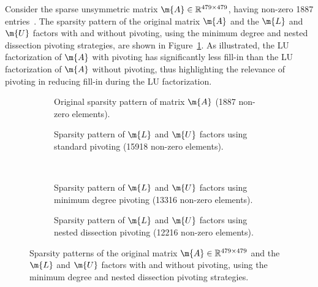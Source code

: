 \begin{example}
  Consider the  sparse unsymmetric matrix $\m{A} \in \mathbb{R}^{479 \times 479}$, having non-zero 1887 entries~\cite{matlab}. The sparsity pattern of the original matrix $\m{A}$ and the $\m{L}$ and $\m{U}$ factors with and without pivoting, using the minimum degree and nested dissection pivoting strategies, are shown in Figure~\ref{chap3:fig:sparsity_patterns}. As illustrated, the \ac{LU} factorization of $\m{A}$ with pivoting has significantly less fill-in than the \ac{LU} factorization of $\m{A}$ without pivoting, thus highlighting the relevance of pivoting in reducing fill-in during the \ac{LU} factorization.
  \begin{figure}[htb]
    \centering
    \begin{subfigure}[t]{0.45\textwidth}
      \centering
      \small{}
      \caption{Original sparsity pattern of matrix $\m{A}$ (1887 non-zero elements).}
    \end{subfigure}%
    \hfill%
    \begin{subfigure}[t]{0.45\textwidth}
      \centering
      \small{}
      \caption{Sparsity pattern of $\m{L}$ and $\m{U}$ factors using standard pivoting (15918 non-zero elements).}
    \end{subfigure} \\[1.0em]
    \begin{subfigure}[t]{0.45\textwidth}
      \centering
      \small{}
      \caption{Sparsity pattern of $\m{L}$ and $\m{U}$ factors using minimum degree pivoting (13316 non-zero elements).}
    \end{subfigure}%
    \hfill%
    \begin{subfigure}[t]{0.45\textwidth}
      \centering
      \small{}
      \caption{Sparsity pattern of $\m{L}$ and $\m{U}$ factors using nested dissection pivoting (12216 non-zero elements).}
    \end{subfigure}
    \caption{Sparsity patterns of the original  matrix $\m{A} \in \mathbb{R}^{479 \times 479}$ and the $\m{L}$ and $\m{U}$ factors with and without pivoting, using the minimum degree and nested dissection pivoting strategies.}
    \label{chap3:fig:sparsity_patterns}
  \end{figure}
\end{example}

